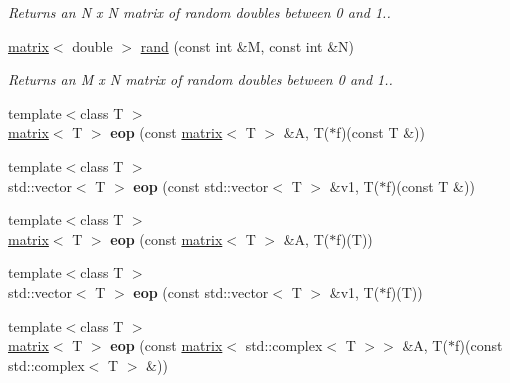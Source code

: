 \begin{DoxyCompactItemize}
\begin{DoxyCompactList}\small\item\em Returns an N x N matrix of random doubles between 0 and 1.. \end{DoxyCompactList}\item 
\hypertarget{namespacekeycpp_a259b4e27cc4ec4d79d27688fdafcf2ca}{\hyperlink{classkeycpp_1_1matrix}{matrix}$<$ double $>$ \hyperlink{namespacekeycpp_a259b4e27cc4ec4d79d27688fdafcf2ca}{rand} (const int \&M, const int \&N)}\label{namespacekeycpp_a259b4e27cc4ec4d79d27688fdafcf2ca}

\begin{DoxyCompactList}\small\item\em Returns an M x N matrix of random doubles between 0 and 1.. \end{DoxyCompactList}\item 
\hypertarget{namespacekeycpp_aae90693acdaf666bd23bf861f2c0d28c}{{\footnotesize template$<$class T $>$ }\\\hyperlink{classkeycpp_1_1matrix}{matrix}$<$ T $>$ {\bfseries eop} (const \hyperlink{classkeycpp_1_1matrix}{matrix}$<$ T $>$ \&A, T($\ast$f)(const T \&))}\label{namespacekeycpp_aae90693acdaf666bd23bf861f2c0d28c}

\item 
\hypertarget{namespacekeycpp_a1122e5d4ae4b58fc150352b5d38d2cdb}{{\footnotesize template$<$class T $>$ }\\std\-::vector$<$ T $>$ {\bfseries eop} (const std\-::vector$<$ T $>$ \&v1, T($\ast$f)(const T \&))}\label{namespacekeycpp_a1122e5d4ae4b58fc150352b5d38d2cdb}

\item 
\hypertarget{namespacekeycpp_a3a1ba458353cfecef659b40e446baaf0}{{\footnotesize template$<$class T $>$ }\\\hyperlink{classkeycpp_1_1matrix}{matrix}$<$ T $>$ {\bfseries eop} (const \hyperlink{classkeycpp_1_1matrix}{matrix}$<$ T $>$ \&A, T($\ast$f)(T))}\label{namespacekeycpp_a3a1ba458353cfecef659b40e446baaf0}

\item 
\hypertarget{namespacekeycpp_ad7d9f15708903bc3f2c6d26693b8872d}{{\footnotesize template$<$class T $>$ }\\std\-::vector$<$ T $>$ {\bfseries eop} (const std\-::vector$<$ T $>$ \&v1, T($\ast$f)(T))}\label{namespacekeycpp_ad7d9f15708903bc3f2c6d26693b8872d}

\item 
\hypertarget{namespacekeycpp_a5afc215befa38bf47fb52cff33794ebe}{{\footnotesize template$<$class T $>$ }\\\hyperlink{classkeycpp_1_1matrix}{matrix}$<$ T $>$ {\bfseries eop} (const \hyperlink{classkeycpp_1_1matrix}{matrix}$<$ std\-::complex$<$ T $>$$>$ \&A, T($\ast$f)(const std\-::complex$<$ T $>$ \&))}\label{namespacekeycpp_a5afc215befa38bf47fb52cff33794ebe}


\end{DoxyCompactItemize}
